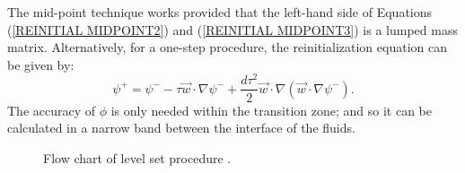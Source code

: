 The mid-point technique works provided that the left-hand side of Equations (\ref{REINITIAL MIDPOINT2}) and (\ref{REINITIAL MIDPOINT3}) is a lumped mass matrix. Alternatively, for a one-step procedure, the reinitialization equation can be given by:
%
\begin{equation}
\psi^{+} = \psi^{-} - \tau \vec{w} \cdot \nabla \psi^{-} + \frac{d \tau^{2}}{2} \vec{w} \cdot \nabla(\vec{w} \cdot \nabla \psi^{-}).
\label{REINITIAL ONESTEP}
\end{equation}
%
The accuracy of $\phi$ is only needed within the transition zone; and so it can be calculated in a narrow band between the interface of the fluids. 
%
\begin{figure}
\center
{}
\caption{Flow chart of level set procedure \cite{LIN2005}.}
\label{LEVELSET FLOWCHART}
\end{figure}
